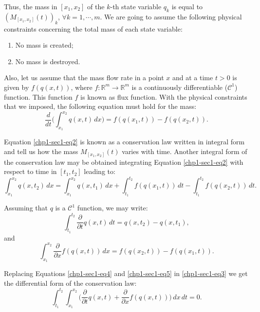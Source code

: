 Thus, the mass in $[x_1, x_2]$ of the $k$-th state variable $q_k$ is equal to
$({M}_{[x_1, x_2]}(t))_k$, $\forall k = 1, \cdots, m$.
We are going to assume the following physical constraints concerning the total mass of each state variable:
\begin{enumerate}
	\item No mass is created;
	\item No mass is destroyed.
\end{enumerate}

Also, let us assume that the mass flow rate in a point $x$ and at a time 
$t > 0$ is given by ${f}({q}(x,t))$, where ${f}:\mathbb{R}^m \to \mathbb{R}^m$ is 
a continuously differentiable ($\mathcal{C}^1$) function. This function ${f}$ is known as flux function.
With the physical constraints that we imposed, the following equation must hold for the mass:
\begin{equation}
	\label{chp1-sec1-eq2}
	\frac{d}{dt} \bigg( \int_{x_1}^{x_2} {q}(x,t) \,dx \bigg) = 
	{f}({q}(x_1,t)) - {f}({q}(x_2,t)) .
\end{equation}

Equation \eqref{chp1-sec1-eq2} is known as a conservation law written in integral form and tell us how the mass 
${M}_{[x_1, x_2]}(t)$ varies with time. Another integral form of the conservation law may be obtained integrating
Equation \eqref{chp1-sec1-eq2} with respect to time in $[t_1, t_2]$ leading to: 
\begin{equation}
	\label{chp1-sec1-eq3}
	\int_{x_1}^{x_2} {q}(x, t_2) \,dx = 
	\int_{x_1}^{x_2} {q}(x, t_1) \,dx + 
	\int_{t_1}^{t_2} {f}({q}(x_1, t)) \,dt -
	\int_{t_1}^{t_2}{f}({q}(x_2, t)) \,dt .
\end{equation}

Assuming that ${q}$ is a $\mathcal{C}^1$ function, we may write:
\begin{equation}
	\label{chp1-sec1-eq4}
	\int_{t_1}^{t_2} 
	\frac{\partial}{\partial t} {q}(x,t) \,dt
	= {q}(x, t_2) - {q}(x, t_1) ,
\end{equation}
and
\begin{equation}
	\label{chp1-sec1-eq5}
	\int_{x_1}^{x_2} \frac{\partial}{\partial x}{f}({q}(x,t)) \,dx 
	= {f}({q}(x_2, t)) -
	{f}( {q}(x_1, t)) .
\end{equation}

Replacing Equations \eqref{chp1-sec1-eq4} and \eqref{chp1-sec1-eq5}
in \eqref{chp1-sec1-eq3} we get the differential form of the conservation law:
\begin{equation}
	\label{chp1-sec1-eq6}
	\int_{t_1}^{t_2} \int_{x_1}^{x_2} 
	\bigg( \frac{\partial}{\partial t}{q}(x, t) 
	+ \frac{\partial}{\partial x} {f}({q}(x, t)) \bigg) 
	\,dx \,dt  = 0.
\end{equation}

